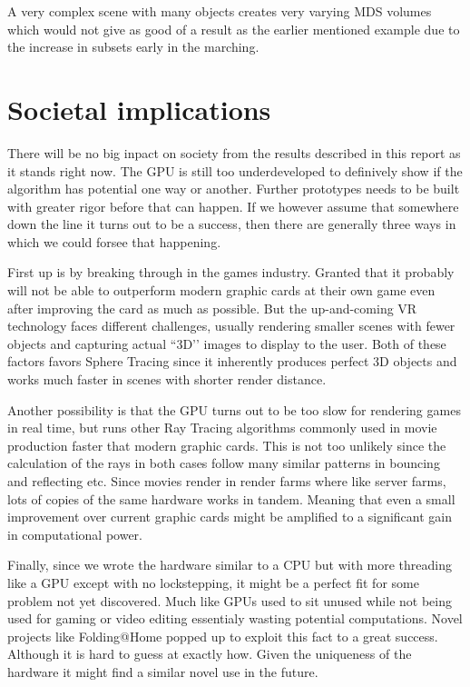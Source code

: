 			A very complex scene with many objects creates very varying MDS
			volumes which would not give as good of a result as the earlier
			mentioned example due to the increase in subsets early in the
			marching.

	\section{Societal implications}

		There will be no big inpact on society from the results described in
		this report as it stands right now. The GPU is still too underdeveloped
		to definively show if the algorithm has potential one way or another.
		Further prototypes needs to be built with greater rigor before that can
		happen. If we however assume that somewhere down the line it turns out
		to be a success, then there are generally three ways in which we could
		forsee that happening.

		First up is by breaking through in the games industry. Granted that it
		probably will not be able to outperform modern graphic cards at their own
		game even after improving the card as much as possible. But the
		up-and-coming VR technology faces different challenges, usually rendering
		smaller scenes with fewer objects and capturing actual ``3D’’ images to
		display to the user. Both of these factors favors Sphere Tracing since it
		inherently produces perfect 3D objects and works much faster in scenes with
		shorter render distance.

		Another possibility is that the GPU turns out to be too slow for
		rendering games in real time, but runs other Ray Tracing algorithms
		commonly used in movie production faster that modern graphic cards.
		This is not too unlikely since the calculation of the rays in both
		cases follow many similar patterns in bouncing and reflecting etc.
		Since movies render in render farms where like server farms, lots of
		copies of the same hardware works in tandem. Meaning that even a small
		improvement over current graphic cards might be amplified to a
		significant gain in computational power.

		Finally, since we wrote the hardware similar to a CPU but with more
		threading like a GPU except with no lockstepping, it might be a perfect
		fit for some problem not yet discovered. Much like GPUs used to sit
		unused while not being used for gaming or video editing essentialy
		wasting potential computations. Novel projects like
		Folding@Home\cite{Beberg2009} popped up to exploit this fact to a great
		success. Although it is hard to guess at exactly how. Given the
		uniqueness of the hardware it might find a similar novel use in the
		future.
